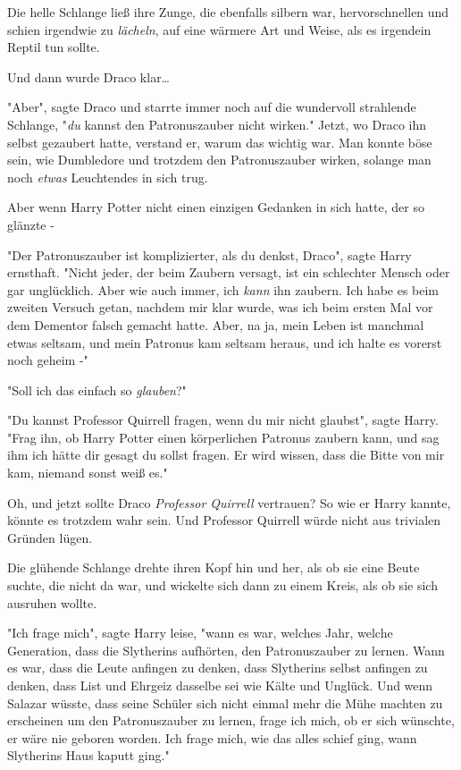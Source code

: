 {Die helle Schlange ließ ihre Zunge, die ebenfalls silbern war, hervorschnellen und schien irgendwie zu \emph{lächeln}, auf eine wärmere Art und Weise, als es irgendein Reptil tun sollte.

Und dann wurde Draco klar…

"Aber", sagte Draco und starrte immer noch auf die wundervoll strahlende Schlange, "\emph{du} kannst den Patronuszauber nicht wirken." Jetzt, wo Draco ihn selbst gezaubert hatte, verstand er, warum das wichtig war. Man konnte böse sein, wie Dumbledore und trotzdem den Patronuszauber wirken, solange man noch \emph{etwas} Leuchtendes in sich trug.

Aber wenn Harry Potter nicht einen einzigen Gedanken in sich hatte, der so glänzte -

"Der Patronuszauber ist komplizierter, als du denkst, Draco", sagte Harry ernsthaft. "Nicht jeder, der beim Zaubern versagt, ist ein schlechter Mensch oder gar unglücklich. Aber wie auch immer, ich \emph{kann} ihn zaubern. Ich habe es beim zweiten Versuch getan, nachdem mir klar wurde, was ich beim ersten Mal vor dem Dementor falsch gemacht hatte. Aber, na ja, mein Leben ist manchmal etwas seltsam, und mein Patronus kam seltsam heraus, und ich halte es vorerst noch geheim -"

"Soll ich das einfach so \emph{glauben}?"

"Du kannst Professor Quirrell fragen, wenn du mir nicht glaubst", sagte Harry. "Frag ihn, ob Harry Potter einen körperlichen Patronus zaubern kann, und sag ihm ich hätte dir gesagt du sollst fragen. Er wird wissen, dass die Bitte von mir kam, niemand sonst weiß es."

Oh, und jetzt sollte Draco \emph{Professor Quirrell} vertrauen? So wie er Harry kannte, könnte es trotzdem wahr sein. Und Professor Quirrell würde nicht aus trivialen Gründen lügen.

Die glühende Schlange drehte ihren Kopf hin und her, als ob sie eine Beute suchte, die nicht da war, und wickelte sich dann zu einem Kreis, als ob sie sich ausruhen wollte.

"Ich frage mich", sagte Harry leise, "wann es war, welches Jahr, welche Generation, dass die Slytherins aufhörten, den Patronuszauber zu lernen. Wann es war, dass die Leute anfingen zu denken, dass Slytherins selbst anfingen zu denken, dass List und Ehrgeiz dasselbe sei wie Kälte und Unglück. Und wenn Salazar wüsste, dass seine Schüler sich nicht einmal mehr die Mühe machten zu erscheinen um den Patronuszauber zu lernen, frage ich mich, ob er sich wünschte, er wäre nie geboren worden. Ich frage mich, wie das alles schief ging, wann Slytherins Haus kaputt ging."

}
